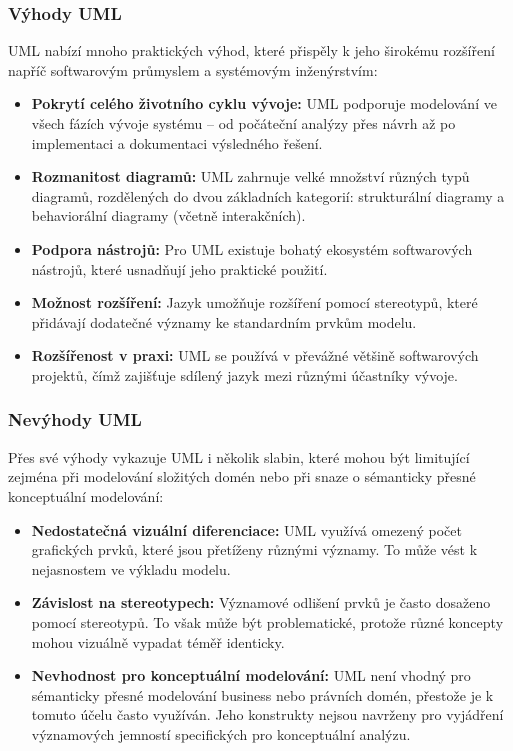 
\subsubsection{Výhody UML}
\label{sec:výhody-uml}
UML nabízí mnoho praktických výhod, které přispěly k jeho širokému rozšíření napříč softwarovým průmyslem a systémovým inženýrstvím:
\begin{itemize}
  \item \textbf{Pokrytí celého životního cyklu vývoje:} UML podporuje modelování ve všech fázích vývoje systému – od počáteční analýzy přes návrh až po implementaci a dokumentaci výsledného řešení.
  \item \textbf{Rozmanitost diagramů:} UML zahrnuje velké množství různých typů diagramů, rozdělených do dvou základních kategorií: strukturální diagramy a behaviorální diagramy (včetně interakčních).
  \item \textbf{Podpora nástrojů:} Pro UML existuje bohatý ekosystém softwarových nástrojů, které usnadňují jeho praktické použití.
  \item \textbf{Možnost rozšíření:} Jazyk umožňuje rozšíření pomocí stereotypů, které přidávají dodatečné významy ke standardním prvkům modelu.
  \item \textbf{Rozšířenost v praxi:} UML se používá v převážné většině softwarových projektů, čímž zajišťuje sdílený jazyk mezi různými účastníky vývoje. \cite{CCMi_uml}
\end{itemize}


\subsubsection{Nevýhody UML}
\label{sec:nevýhody-uml}
Přes své výhody vykazuje UML i několik slabin, které mohou být limitující zejména při modelování složitých domén nebo při snaze o sémanticky přesné konceptuální modelování:
\begin{itemize}
  \item \textbf{Nedostatečná vizuální diferenciace:} UML využívá omezený počet grafických prvků, které jsou přetíženy různými významy. To může vést k nejasnostem ve výkladu modelu.
  \item \textbf{Závislost na stereotypech:} Významové odlišení prvků je často dosaženo pomocí stereotypů. To však může být problematické, protože různé koncepty mohou vizuálně vypadat téměř identicky.
  \item \textbf{Nevhodnost pro konceptuální modelování:} UML není vhodný pro sémanticky přesné modelování business nebo právních domén, přestože je k tomuto účelu často využíván. Jeho konstrukty nejsou navrženy pro vyjádření významových jemností specifických pro konceptuální analýzu. \cite{CCMi_uml}
\end{itemize}

